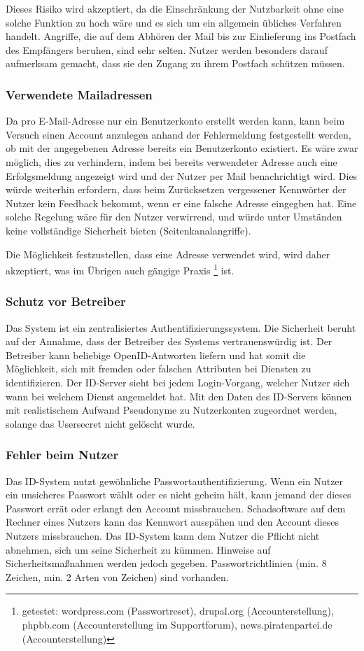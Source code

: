 \documentclass[parskip=half]{scrartcl}
\begin{document}
Dieses Risiko wird akzeptiert, da die Einschränkung der Nutzbarkeit ohne eine solche Funktion zu hoch wäre und es sich um ein allgemein übliches Verfahren handelt.
Angriffe, die auf dem Abhören der Mail bis zur Einlieferung ins Postfach des Empfängers beruhen, sind sehr selten.
Nutzer werden besonders darauf aufmerksam gemacht, dass sie den Zugang zu ihrem Postfach schützen müssen.

\subsubsection{Verwendete Mailadressen}
Da pro E-Mail-Adresse nur ein Benutzerkonto erstellt werden kann, kann beim Versuch einen Account anzulegen anhand der Fehlermeldung festgestellt werden,
ob mit der angegebenen Adresse bereits ein Benutzerkonto existiert.
Es wäre zwar möglich, dies zu verhindern, indem bei bereits verwendeter Adresse auch eine Erfolgsmeldung angezeigt wird und der Nutzer per Mail benachrichtigt wird.
Dies würde weiterhin erfordern, dass beim Zurücksetzen vergessener Kennwörter der Nutzer kein Feedback bekommt, wenn er eine falsche Adresse eingegben hat.
Eine solche Regelung wäre für den Nutzer verwirrend, und würde unter Umständen keine vollständige Sicherheit bieten (Seitenkanalangriffe).

Die Möglichkeit festzustellen, dass eine Adresse verwendet wird, wird daher akzeptiert,
was im Übrigen auch gängige Praxis
\footnote{getestet: wordpress.com (Passwortreset), drupal.org (Accounterstellung), phpbb.com (Accounterstellung im Supportforum), news.piratenpartei.de (Accounterstellung)}
ist.

\subsubsection{Schutz vor Betreiber}
Das System ist ein zentralisiertes Authentifizierungssystem.
Die Sicherheit beruht auf der Annahme, dass der Betreiber des Systems vertrauenswürdig ist.
Der Betreiber kann beliebige OpenID-Antworten liefern und hat somit die Möglichkeit, sich mit fremden oder falschen Attributen bei Diensten zu identifizieren.
Der ID-Server sieht bei jedem Login-Vorgang, welcher Nutzer sich wann bei welchem Dienst angemeldet hat.
Mit den Daten des ID-Servers können mit realistischem Aufwand Pseudonyme zu Nutzerkonten zugeordnet werden, solange das Usersecret nicht gelöscht wurde.

\subsubsection{Fehler beim Nutzer}
Das ID-System nutzt gewöhnliche Passwortauthentifizierung.
Wenn ein Nutzer ein unsicheres Passwort wählt oder es nicht geheim hält, kann jemand der dieses Passwort errät oder erlangt den Account missbrauchen.
Schadsoftware auf dem Rechner eines Nutzers kann das Kennwort ausspähen und den Account dieses Nutzers missbrauchen.
Das ID-System kann dem Nutzer die Pflicht nicht abnehmen, sich um seine Sicherheit zu kümmen. Hinweise auf Sicherheitsmaßnahmen werden jedoch gegeben.
Passwortrichtlinien (min. 8 Zeichen, min. 2 Arten von Zeichen) sind vorhanden.
\end{document}
